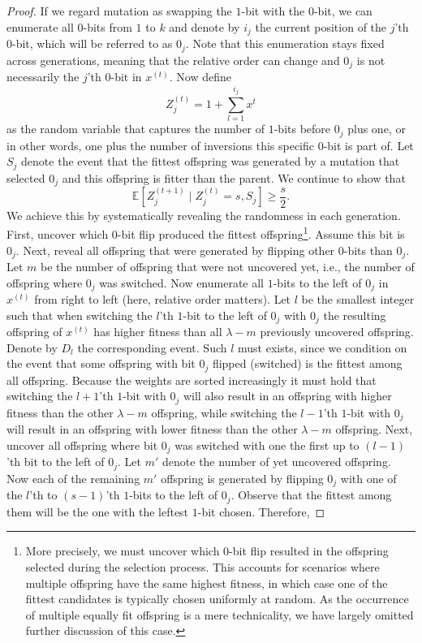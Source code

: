 \begin{proof}
    If we regard mutation as swapping the $1$-bit with the $0$-bit, we can enumerate all $0$-bits from $1$ to $k$ and denote by $i_j$ the current position of the $j$'th $0$-bit, which will be referred to as $0_j$. Note that this enumeration stays fixed across generations, meaning that the relative order can change and $0_j$ is not necessarily the $j$'th $0$-bit in $x^{(t)}$. Now define 
    \begin{displaymath}
    Z^{(t)}_j = 1+\sum_{l=1}^{i_j} x^{t} 
    \end{displaymath}
    as the random variable that captures the number of $1$-bits before $0_j$ plus one, or in other words, one plus the number of inversions this specific $0$-bit is part of. Let $S_j$ denote the event that the fittest offspring was generated by a mutation that selected $0_j$ and this offspring is fitter than the parent. We continue to show that
    \begin{displaymath}
    \mathbb{E}[Z^{(t+1)}_j \;|\; Z_j^{(t)}=s, S_j] \ge \frac{s}{2}.
    \end{displaymath}
    We achieve this by systematically revealing the randomness in each generation. First, uncover which $0$-bit flip produced the fittest offspring\footnote{More precisely, we must uncover which $0$-bit flip resulted in the offspring selected during the selection process. This accounts for scenarios where multiple offspring have the same highest fitness, in which case one of the fittest candidates is typically chosen uniformly at random. As the occurrence of multiple equally fit offspring is a mere technicality, we have largely omitted further discussion of this case.}. Assume this bit is $0_j$. Next, reveal all offspring that were generated by flipping other $0$-bits than $0_j$. Let $m$ be the number of offspring that were not uncovered yet, i.e., the number of offspring where $0_j$ was switched. Now enumerate all $1$-bits to the left of $0_j$ in $x^{(t)}$ from right to left (here, relative order matters). Let $l$ be the smallest integer such that when switching the $l$'th $1$-bit to the left of $0_j$ with $0_j$ the resulting offspring of $x^{(t)}$ has higher fitness than all $\lambda-m$ previously uncovered offspring. Denote by $D_l$ the corresponding event. Such $l$ must exists, since we condition on the event that some offspring with bit $0_j$ flipped (switched) is the fittest among all offspring. Because the weights are sorted increasingly it must hold that switching the $l+1$'th $1$-bit with $0_j$ will also result in an offspring with higher fitness than the other $\lambda - m$ offspring, while switching the $l-1$'th $1$-bit with $0_j$ will result in an offspring with lower fitness than the other $\lambda-m$ offspring. Next, uncover all offspring where bit $0_j$ was switched with one the first up to $(l-1)$'th bit to the left of $0_j$. Let $m'$ denote the number of yet uncovered offspring. Now each of the remaining $m'$ offspring is generated by flipping $0_j$ with one of the $l$'th to $(s-1)$'th $1$-bits to the left of $0_j$. Observe that the fittest among them will be the one with the leftest $1$-bit chosen. Therefore, 

\end{proof}
